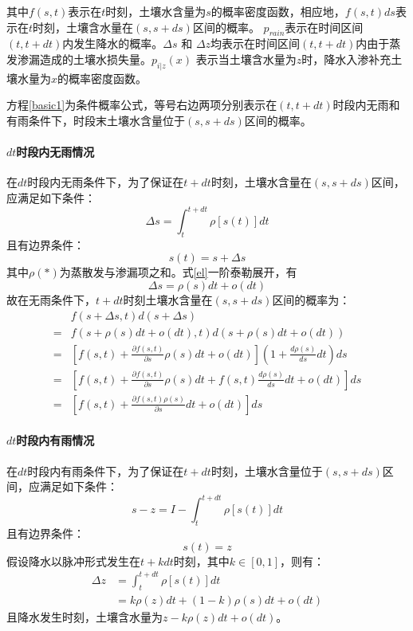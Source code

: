 其中$f(s,t)$表示在$t$时刻，土壤水含量为$s$的概率密度函数，相应地，$f(s,t)ds$表示在$t$时刻，土壤含水量在$(s,s+ds)$区间的概率。 $ p_{rain}$表示在时间区间$(t,t+dt)$内发生降水的概率。$\Delta s$ 和 $\Delta z$均表示在时间区间$(t,t+dt)$内由于蒸发渗漏造成的土壤水损失量。$p_{i|z}(x)$ 表示当土壤含水量为$z$时，降水入渗补充土壤水量为$x$的概率密度函数。

方程\ref{basic1}为条件概率公式，等号右边两项分别表示在$(t,t+dt)$时段内无雨和有雨条件下，时段末土壤水含量位于$(s,s+ds)$区间的概率。

\paragraph{$dt$时段内无雨情况}


在$dt$时段内无雨条件下，为了保证在$t+dt$时刻，土壤水含量在$(s,s+ds)$区间，应满足如下条件：
\begin{equation}
\label{el}
\Delta s=\int_t^{t+dt} \rho[s(t)]dt
\end{equation}
且有边界条件：
\begin{equation}
s(t)=s+\Delta s
\end{equation}
其中$\rho(*)$为蒸散发与渗漏项之和。式\ref{el}一阶泰勒展开，有
\begin{equation}
\Delta s=\rho(s)dt+o(dt)
\end{equation}
故在无雨条件下，$t+dt$时刻土壤水含量在$(s,s+ds)$区间的概率为：
\begin{equation}
\label{norain1}
\begin{split}
&f(s+\Delta s,t)d(s+\Delta s)\\=&f(s+\rho(s)dt+o(dt),t)d(s+\rho(s)dt+o(dt))
\\=&[f(s,t)+\frac{\partial{f(s,t)}}{\partial s}\rho(s)dt+o(dt)](1+\frac{d\rho(s)}{ds}dt)ds
\\=&[f(s,t)+\frac{\partial{f(s,t)}}{\partial s}\rho(s)dt+f(s,t)\frac{d\rho(s)}{ds}dt+o(dt)]ds
\\=&[f(s,t)+\frac{\partial{f(s,t)\rho(s)}}{\partial s}dt+o(dt)]ds
\end{split}
\end{equation}


\paragraph{$dt$时段内有雨情况} 

在$dt$时段内有雨条件下，为了保证在$t+dt$时刻，土壤水含量位于$(s,s+ds)$区间，应满足如下条件：
\begin{equation}
s-z=I-\int_t^{t+dt} \rho[s(t)]dt
\end{equation}
且有边界条件：
\begin{equation}
s(t)=z
\end{equation}
假设降水以脉冲形式发生在$t+kdt$时刻，其中$k \in [0,1]$，则有：
\begin{equation}
\label{deltat}
\begin{split}
\Delta z&=\int_t^{t+dt} \rho[s(t)]dt\\
&=k\rho(z)dt+(1-k)\rho(s)dt+o(dt)
\end{split}
\end{equation} 
且降水发生时刻，土壤含水量为$z-k\rho(z)dt+o(dt)$。

